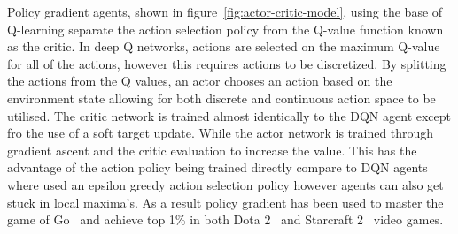 Policy gradient agents, shown in figure~\ref{fig:actor-critic-model}, using the base of Q-learning separate the action
selection policy from the Q-value function known as the critic. In deep Q networks, actions are selected on the maximum
Q-value for all of the actions, however this requires actions to be discretized. By splitting the actions from the Q
values, an actor chooses an action based on the environment state allowing for both discrete and continuous action space
to be utilised. The critic network is trained almost identically to the DQN agent except fro the use of a soft target update.
While the actor network is trained through gradient ascent and the critic evaluation to increase the value. This has the
advantage of the action policy being trained directly compare to DQN agents where used an epsilon greedy action selection
policy however agents can also get stuck in local maxima's. As a result policy gradient has been
used to master the game of Go~\citep{silver2017mastering} and achieve top 1\% in both
Dota 2~\citep{OpenAI_dota} and Starcraft 2~\citep{starcraft2} video games.